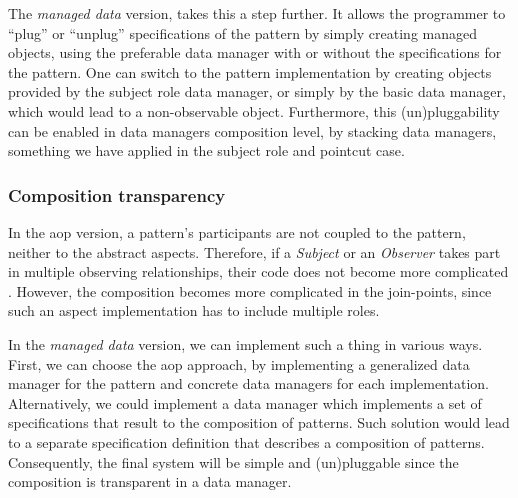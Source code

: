 The \textit{managed data} version, takes this a step further.
It allows the programmer to ``plug'' or ``unplug'' specifications of the pattern by simply creating managed objects, using the preferable data manager with or without the specifications for the pattern.
One can switch to the pattern implementation by creating objects provided by the subject role data manager, or simply by the basic data manager, which would lead to a non-observable object.
Furthermore, this (un)pluggability can be enabled in data managers composition level, by stacking data managers, something we have applied in the subject role and pointcut case.

\subsubsection{Composition transparency}

In the \ac{aop} version, a pattern's participants are not coupled to the pattern, neither to the abstract aspects.
Therefore, if a \textit{Subject} or an \textit{Observer} takes part in multiple observing relationships, their code does not become more complicated \cite{hannemann2005role}.
However, the composition becomes more complicated in the join-points, since such an aspect implementation has to include multiple roles.

In the \textit{managed data} version, we can implement such a thing in various ways.
First, we can choose the \ac{aop} approach, by implementing a generalized data manager for the pattern and concrete data managers for each implementation.
Alternatively, we could implement a data manager which implements a set of specifications that result to the composition of patterns.
Such solution would lead to a separate specification definition that describes a composition of patterns.
Consequently, the final system will be simple and (un)pluggable since the composition is transparent in a data manager.

